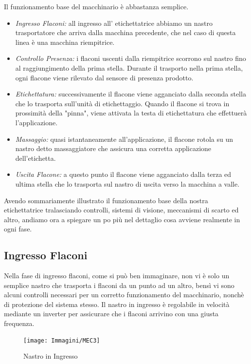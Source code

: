 \documentclass[12pt, a4paper, oneside]{book}
\begin{document}
Il funzionamento base del macchinario è abbastanza semplice. 
\begin{itemize}
	\item \textit{Ingresso Flaconi:} all ingresso all' etichettatrice abbiamo un nastro trasportatore che arriva dalla macchina precedente, che nel caso di questa linea è una macchina riempitrice.
	\item \textit{Controllo Presenza:}  i flaconi uscenti dalla riempitrice scorrono sul nastro fino al raggiungimento della prima stella. Durante il trasporto nella prima stella, ogni flacone viene rilevato dal sensore di presenza prodotto.
	\item \textit{Etichettatura:} successivamente il flacone viene agganciato dalla seconda stella che lo trasporta sull'unità di etichettaggio. Quando il flacone si trova in prossimità della "pinna", viene attivata la testa di etichettatura che effettuerà l'applicazione.
	\item \textit{Massaggio:} quasi istantaneamente all'applicazione, il flacone rotola su un nastro detto massaggiatore che assicura una corretta applicazione dell'etichetta.
	\item \textit{Uscita Flacone:} a questo punto il flacone viene agganciato dalla terza ed ultima stella che lo trasporta sul nastro di uscita verso la macchina a valle. 
\end{itemize}

Avendo sommariamente illustrato il funzionamento base della nostra etichettatrice tralasciando controlli, sistemi di visione, meccanismi di scarto ed altro, andiamo ora a spiegare un po più nel dettaglio cosa avviene realmente in ogni fase.

\subsection{Ingresso Flaconi}
Nella fase di ingresso flaconi, come si può ben immaginare, non vi è solo un semplice nastro che trasporta i flaconi da un punto ad un altro, bensì vi sono alcuni controlli necessari per un corretto funzionamento del macchinario, nonchè di protezione del sistema stesso. Il nastro in ingresso è regolabile in velocità mediante un inverter per assicurare che i flaconi arrivino con una giusta frequenza. 

\begin{figure}[H]
	\centering
	\texttt{[image: Immagini/MEC3]}
	\label{mec3}
	\caption{ Nastro in Ingresso}
\end{figure}
\end{document}

